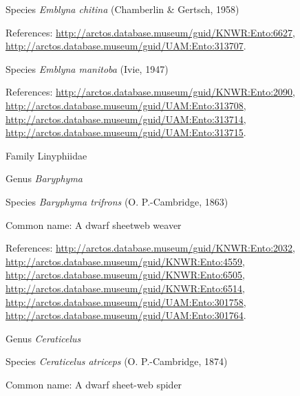\documentclass[9pt, article]{memoir}
\begin{document}
\begin{multicols}{2}
\vspace{6pt}\noindent\hspace{36pt}Species \textit{Emblyna chitina} (Chamberlin \& Gertsch, 1958)


References: 
\url{http://arctos.database.museum/guid/KNWR:Ento:6627}, 
\url{http://arctos.database.museum/guid/UAM:Ento:313707}.

\vspace{6pt}\noindent\hspace{36pt}Species \textit{Emblyna manitoba} (Ivie, 1947)


References: 
\url{http://arctos.database.museum/guid/KNWR:Ento:2090}, 
\url{http://arctos.database.museum/guid/UAM:Ento:313708}, 
\url{http://arctos.database.museum/guid/UAM:Ento:313714}, 
\url{http://arctos.database.museum/guid/UAM:Ento:313715}.

\vspace{6pt}\noindent\hspace{24pt}Family Linyphiidae


\vspace{6pt}\noindent\hspace{30pt}Genus \textit{Baryphyma}


\vspace{6pt}\noindent\hspace{36pt}Species \textit{Baryphyma trifrons} (O. P.-Cambridge, 1863)


Common name: A dwarf sheetweb weaver

References: 
\url{http://arctos.database.museum/guid/KNWR:Ento:2032}, 
\url{http://arctos.database.museum/guid/KNWR:Ento:4559}, 
\url{http://arctos.database.museum/guid/KNWR:Ento:6505}, 
\url{http://arctos.database.museum/guid/KNWR:Ento:6514}, 
\url{http://arctos.database.museum/guid/UAM:Ento:301758}, 
\url{http://arctos.database.museum/guid/UAM:Ento:301764}.

\vspace{6pt}\noindent\hspace{30pt}Genus \textit{Ceraticelus}


\vspace{6pt}\noindent\hspace{36pt}Species \textit{Ceraticelus atriceps} (O. P.-Cambridge, 1874)


Common name: A dwarf sheet-web spider


\end{multicols}
\end{document}
